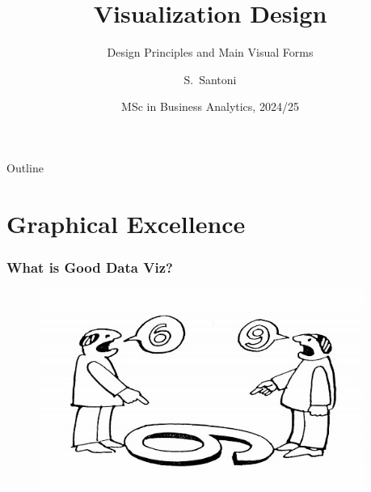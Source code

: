 \documentclass[aspectratio=1610]{beamer}
\title[Visualization Design]%
{Visualization Design}
\subtitle{Design Principles and Main Visual Forms}
\author{S.~Santoni\inst{1}}
\institute{
	\inst{1}%
	Bayes Business School
	}
\date{MSc in Business Analytics, 2024/25}
\begin{document}
\begin{frame}
	\titlepage
\end{frame}

\begin{frame}{Outline}
	\tableofcontents
\end{frame}

\section{Graphical Excellence}

\begin{frame}
	\frametitle{What is Good Data Viz?}
	\begin{figure}
		\begin{small}
			\begin{center}
				\includegraphics[width=0.95\textwidth]{images/subjectivity.jpg}
			\end{center}
		\end{small}
	\end{figure}
\end{frame}
\end{document}

